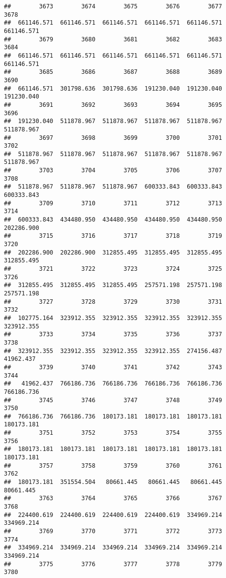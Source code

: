 \documentclass[
]{book}
\begin{document}
\begin{verbatim}
##        3673        3674        3675        3676        3677        3678 
##  661146.571  661146.571  661146.571  661146.571  661146.571  661146.571 
##        3679        3680        3681        3682        3683        3684 
##  661146.571  661146.571  661146.571  661146.571  661146.571  661146.571 
##        3685        3686        3687        3688        3689        3690 
##  661146.571  301798.636  301798.636  191230.040  191230.040  191230.040 
##        3691        3692        3693        3694        3695        3696 
##  191230.040  511878.967  511878.967  511878.967  511878.967  511878.967 
##        3697        3698        3699        3700        3701        3702 
##  511878.967  511878.967  511878.967  511878.967  511878.967  511878.967 
##        3703        3704        3705        3706        3707        3708 
##  511878.967  511878.967  511878.967  600333.843  600333.843  600333.843 
##        3709        3710        3711        3712        3713        3714 
##  600333.843  434480.950  434480.950  434480.950  434480.950  202286.900 
##        3715        3716        3717        3718        3719        3720 
##  202286.900  202286.900  312855.495  312855.495  312855.495  312855.495 
##        3721        3722        3723        3724        3725        3726 
##  312855.495  312855.495  312855.495  257571.198  257571.198  257571.198 
##        3727        3728        3729        3730        3731        3732 
##  102775.164  323912.355  323912.355  323912.355  323912.355  323912.355 
##        3733        3734        3735        3736        3737        3738 
##  323912.355  323912.355  323912.355  323912.355  274156.487   41962.437 
##        3739        3740        3741        3742        3743        3744 
##   41962.437  766186.736  766186.736  766186.736  766186.736  766186.736 
##        3745        3746        3747        3748        3749        3750 
##  766186.736  766186.736  180173.181  180173.181  180173.181  180173.181 
##        3751        3752        3753        3754        3755        3756 
##  180173.181  180173.181  180173.181  180173.181  180173.181  180173.181 
##        3757        3758        3759        3760        3761        3762 
##  180173.181  351554.504   80661.445   80661.445   80661.445   80661.445 
##        3763        3764        3765        3766        3767        3768 
##  224400.619  224400.619  224400.619  224400.619  334969.214  334969.214 
##        3769        3770        3771        3772        3773        3774 
##  334969.214  334969.214  334969.214  334969.214  334969.214  334969.214 
##        3775        3776        3777        3778        3779        3780 

\end{verbatim}
\end{document}
